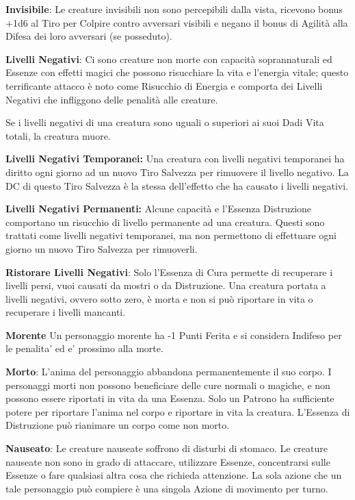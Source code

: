 \documentclass[a4paper,11pt,twoside,openany]{book}
\begin{document}
\textbf{Invisibile}: Le creature invisibili non sono percepibili dalla vista, ricevono bonus +1d6 al Tiro per Colpire contro avversari visibili e negano il bonus di Agilità alla Difesa dei loro avversari (se posseduto).

\textbf{Livelli Negativi}: Ci sono creature non morte con capacità soprannaturali ed Essenze con effetti magici che possono risucchiare la vita e l'energia vitale; questo terrificante attacco è noto come Risucchio di Energia e comporta dei Livelli Negativi che infliggono delle penalità alle creature.

Se i livelli negativi di una creatura sono uguali o superiori ai suoi Dadi Vita totali, la creatura muore.

\textbf{Livelli Negativi Temporanei:} Una creatura con livelli negativi temporanei ha diritto ogni giorno ad un nuovo Tiro Salvezza per rimuovere il livello negativo. La DC di questo Tiro Salvezza è la stessa dell'effetto che ha causato i livelli negativi.

\textbf{Livelli Negativi Permanenti:} Alcune capacità e l'Essenza Distruzione comportano un risucchio di livello permanente ad una creatura. Questi sono trattati come livelli negativi temporanei, ma non permettono di effettuare ogni giorno un nuovo Tiro Salvezza per rimuoverli.

\textbf{Ristorare Livelli Negativi}: Solo l'Essenza di Cura permette di recuperare i livelli persi, vuoi causati da mostri o da Distruzione. Una creatura portata a livelli negativi, ovvero sotto zero, è morta e non si può riportare in vita o recuperare i livelli mancanti.

\textbf{Morente} Un personaggio morente ha -1 Punti Ferita e si considera Indifeso per le penalita' ed e' prossimo alla morte.

\textbf{Morto}: L'anima del personaggio abbandona permanentemente il suo corpo. I personaggi morti non possono beneficiare delle cure normali o magiche, e non possono essere riportati in vita da una Essenza. Solo un Patrono ha sufficiente potere per riportare l'anima nel corpo e riportare in vita la creatura. L'Essenza di Distruzione può rianimare un corpo come non morto.

\textbf{Nauseato}: Le creature nauseate soffrono di disturbi di stomaco.
Le creature nauseate non sono in grado di attaccare, utilizzare Essenze, concentrarsi sulle Essenze o fare qualsiasi altra cosa che richieda attenzione. La sola azione che un tale personaggio può compiere è una singola Azione di movimento per turno.
\end{document}
